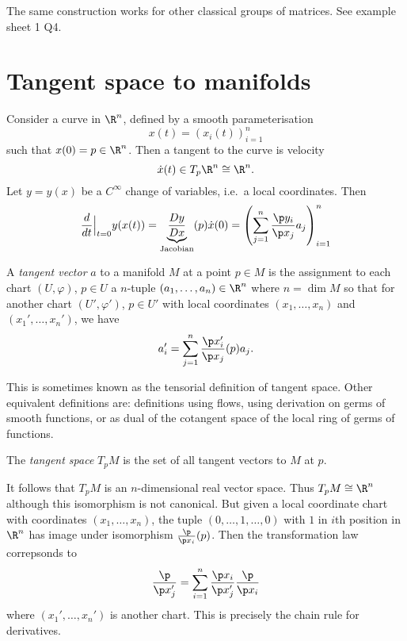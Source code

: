 \documentclass[a4paper]{article}
\begin{document}
The same construction works for other classical groups of matrices. See example sheet 1 Q4.

\section{Tangent space to manifolds}

Consider a curve in \(\R^n\), defined by a smooth parameterisation
\[
  x(t) = (x_i(t))_{i = 1}^n
\]
such that \(x(0) = p \in \R^n\). Then a tangent to the curve is velocity
\[
  \dot x(t) \in T_p\R^n \cong \R^n.
\]
Let \(y = y(x)\) be a \(C^\infty\) change of variables, i.e.\ a local coordinates. Then
\[
  \frac{d}{dt} \Big|_{t = 0} y(x(t)) = \underbrace{\frac{D y}{D x}}_{\text{Jacobian}}(p) \dot x(0)
  = \left( \sum_{j = 1}^n \frac{\p y_i}{\p x_j} a_j \right)_{i = 1}^n
\]

\begin{definition}
  A \emph{tangent vector} \(a\) to a manifold \(M\) at a point \(p \in M\) is the assignment to each chart \((U, \varphi)\), \(p \in U\) a \(n\)-tuple \((a_1, \dots, a_n) \in \R^n\) where \(n = \dim M\) so that for another chart \((U', \varphi')\), \(p \in U'\) with local coordinates \((x_1, \dots, x_n)\) and \((x_1', \dots, x_n')\), we have
  \[
    a_i' = \sum_{j = 1}^n \frac{\p x_i'}{\p x_j} (p) a_j.
  \]
\end{definition}

This is sometimes known as the tensorial definition of tangent space. Other equivalent definitions are: definitions using flows, using derivation on germs of smooth functions, or as dual of the cotangent space of the local ring of germs of functions.

\begin{definition}
  The \emph{tangent space} \(T_pM\) is the set of all tangent vectors to \(M\) at \(p\).
\end{definition}

It follows that \(T_pM\) is an \(n\)-dimensional real vector space. Thus \(T_pM \cong \R^n\) although this isomorphism is not canonical. But given a local coordinate chart with coordinates \((x_1, \dots, x_n)\), the tuple \((0, \dots, 1, \dots, 0)\) with \(1\) in \(i\)th position in \(\R^n\) has image under isomorphism \(\frac{\p}{\p x_i} (p)\). Then the transformation law correpsonds to
\[
  \frac{\p}{\p x_j'} = \sum_{i = 1}^n \frac{\p x_i}{\p x_j'} \frac{\p}{\p x_i}
\]
where \((x_1', \dots, x_n')\) is another chart. This is precisely the chain rule for derivatives.
\end{document}
